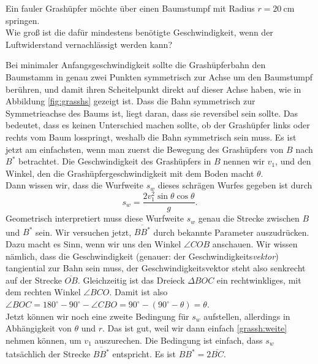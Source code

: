 \begin{Exercise}[label = grassh, title = fauler Grashüpfer, origin = P.Gnädig, difficulty = 5]
	Ein fauler Grashüpfer möchte über einen Baumstumpf mit Radius $r = 20~\mathrm{cm}$ springen.\\
	Wie groß ist die dafür mindestens benötigte Geschwindigkeit, wenn der Luftwiderstand vernachlässigt werden kann?
\end{Exercise}
\begin{Answer}
	Bei minimaler Anfangsgeschwindigkeit sollte die Grashüpferbahn den Baumstamm in genau zwei Punkten symmetrisch zur Achse um den Baumstumpf berühren, und damit ihren Scheitelpunkt direkt auf dieser Achse haben, wie in Abbildung \ref{fig:grasshs} gezeigt ist. Dass die Bahn symmetrisch zur Symmetrieachse des Baums ist, liegt daran, dass sie reversibel sein sollte. Das bedeutet, dass es keinen Unterschied machen sollte, ob der Grashüpfer links oder rechts vom Baum losspringt, weshalb die Bahn symmetrisch sein muss. 
	Es ist jetzt am einfachsten, wenn man zuerst die Bewegung des Grashüpfers von $B$ nach $B^{\ast}$ betrachtet. Die Geschwindigkeit des Grashüpfers in $B$ nennen wir $v_1$, und den Winkel, den die Grashüpfergeschwindigkeit mit dem Boden macht $\theta$.\\
	Dann wissen wir, dass die Wurfweite $s_w$ dieses schrägen Wurfes gegeben ist durch
	\begin{equation}\label{grassh:weite}
		s_w = \frac{2 v_1^2 \sin \theta \cos \theta}{g}.
	\end{equation}
	Geometrisch interpretiert muss diese Wurfweite $s_w$ genau die Strecke zwischen $B$ und $B^{\ast}$ sein. Wir versuchen jetzt, $\overline{BB^{\ast}}$ durch bekannte Parameter auszudrücken.\\
	Dazu macht es Sinn, wenn wir uns den Winkel $\angle COB$ anschauen. Wir wissen nämlich, dass die Geschwindigkeit (genauer: der Geschwindigkeits\textit{vektor}) tangiential zur Bahn sein muss, der Geschwindigkeitsvektor steht also senkrecht auf der Strecke $\overline{OB}$. Gleichzeitig ist das Dreieck $\Delta BOC$ ein rechtwinkliges, mit dem rechten Winkel $\angle BCO$. Damit ist also $\angle BOC = 180^\circ-90^\circ-\angle CBO = 90^\circ- \left(90^\circ- \theta\right) = \theta$.\\
	Jetzt können wir noch eine zweite Bedingung für $s_w$ aufstellen, allerdings in Abhängigkeit von $\theta$ und $r$. Das ist gut, weil wir dann einfach \eqref{grassh:weite} nehmen können, um $v_1$ auszurechen. Die Bedingung ist einfach, dass $s_w$ tatsächlich der Strecke $\overline{BB^\ast}$ entspricht. Es ist $\overline{BB^\ast} = 2 \overline{BC}$.\\

\end{Answer}
